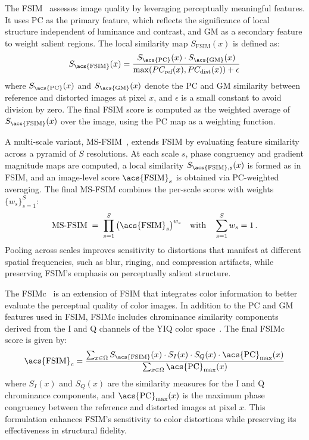 The \acf{FSIM}~\cite{zhang2011fsim} assesses image quality by leveraging perceptually meaningful features. It uses \acf{PC} as the primary feature, which reflects the significance of local structure independent of luminance and contrast, and \acf{GM} as a secondary feature to weight salient regions. The local similarity map $S_{\text{FSIM}}(x)$ is defined as:
\begin{equation}
S_{\text{\acs{FSIM}}}(x) = \frac{S_{\text{\acs{PC}}}(x) \cdot S_{\text{\acs{GM}}}(x)}{\max(PC_{\text{ref}}(x), PC_{\text{dist}}(x)) + \epsilon}
\end{equation}
where $S_{\text{\acs{PC}}}(x)$ and $S_{\text{\acs{GM}}}(x)$ denote the \acs{PC} and \acs{GM} similarity between reference and distorted images at pixel $x$, and $\epsilon$ is a small constant to avoid division by zero. The final \acs{FSIM} score is computed as the weighted average of $S_{\text{\acs{FSIM}}}(x)$ over the image, using the \acs{PC} map as a weighting function.

A multi-scale variant, \acf{MS-FSIM}~\cite{zhang2011fsim}, extends \acs{FSIM} by evaluating feature similarity across a pyramid of $S$ resolutions. At each scale $s$, phase congruency and gradient magnitude maps are computed, a local similarity $S_{\text{\acs{FSIM}},s}(x)$ is formed as in \acs{FSIM}, and an image-level score $\text{\acs{FSIM}}_s$ is obtained via \acs{PC}-weighted averaging. The final \acs{MS-FSIM} combines the per-scale scores with weights $\{w_s\}_{s=1}^S$:
\begin{equation}
\text{MS-FSIM} \;=\; \prod_{s=1}^{S} \big(\text{\acs{FSIM}}_s\big)^{w_s}
\quad\text{with}\quad \sum_{s=1}^{S} w_s = 1 \, .
\end{equation}
Pooling across scales improves sensitivity to distortions that manifest at different spatial frequencies, such as blur, ringing, and compression artifacts, while preserving \acs{FSIM}'s emphasis on perceptually salient structure.

The \acf{FSIMc}~\cite{zhang2011fsim} is an extension of \acs{FSIM} that integrates color information to better evaluate the perceptual quality of color images. In addition to the \acs{PC} and \acs{GM} features used in \acs{FSIM}, \acs{FSIMc} includes chrominance similarity components derived from the I and Q channels of the YIQ color space~\cite{ntsc1953yiq}. The final \acs{FSIMc} score is given by:
\begin{equation}
\text{\acs{FSIM}}_c = \frac{\sum_{x \in \Omega} S_{\text{\acs{FSIM}}}(x) \cdot S_I(x) \cdot S_Q(x) \cdot \text{\acs{PC}}_{\max}(x)}{\sum_{x \in \Omega} \text{\acs{PC}}_{\max}(x)}
\end{equation}
where $S_I(x)$ and $S_Q(x)$ are the similarity measures for the I and Q chrominance components, and $\text{\acs{PC}}_{\max}(x)$ is the maximum phase congruency between the reference and distorted images at pixel $x$. This formulation enhances \acs{FSIM}'s sensitivity to color distortions while preserving its effectiveness in structural fidelity.

